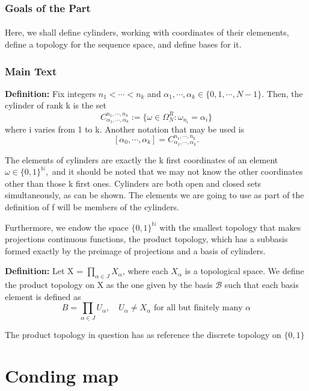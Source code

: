 \documentclass[a4paper]{article}
\theoremstyle{plain}
\theoremstyle{definition}
\begin{document}
  \subsubsection{Goals of the Part} 
  \paragraph{} Here, we shall define cylinders, working with coordinates of their elemenents, define a topology for the sequence space, and define 
 bases for it. 
 \subsubsection{Main Text} 

  \textbf{Definition:}  
   Fix integers $n _{1} < \cdots < n _{k}$ and $\alpha _{1}, \cdots, \alpha _{k}\in \{0, 1, \cdots, N-1\} $. Then, the cylinder of rank k is the set 
   $$ 
   C _{\alpha _{1}, \cdots, \alpha _{k}}^{n _{1}, \cdots, n _{k}}:= \{\omega\in \Omega _{N}^{R}: \omega _{n_i} = \alpha _{i}\} 
   $$ 
 where i varies from 1 to k. Another notation that may be used is  
   $$ 
     [\alpha_{0}, \cdots, \alpha_{k}] = C_{\alpha_{1},\cdots,\alpha_{k}}^{n_{1},\cdots,n_{k}}. 
   $$ 

  
  The elements of cylinders are exactly the k first coordinates of an element $\omega\in \{0, 1\}^{\mathbb{N}},$ and it should 
 be noted that we may not know the other coordinates other than those k first ones. Cylinders are both open and closed  
 sets simultaneously, as can be shown. The elements we are going to use as part of the definition of f will be members of 
 the cylinders. 
    
   Furthermore, we endow the space $\{0, 1\}^{\mathbb{N}}$ with the smallest topology that makes projections continuous functions, the product topology, 
 which has a subbasis formed exactly by the preimage of projections and a basis of cylinders.  

 \textbf{Definition:}  
   Let X = $\prod\limits _{\alpha\in{J}} X _{\alpha}$, where each $X _{\alpha}$ is a topological space. We define the product 
 topology on X as the one given by the basis $\mathcal{B}$ such that each basis element is defined as 
   $$ 
   B = \prod _{\alpha\in{J}} U _{\alpha}, \quad U _{\alpha}\neq{X _{\alpha}} \text{ for all but finitely many }\alpha 
   $$ 

 
   The product topology in question has as reference the discrete topology on $\{0, 1\}$

\section{Conding map}
\end{document}
